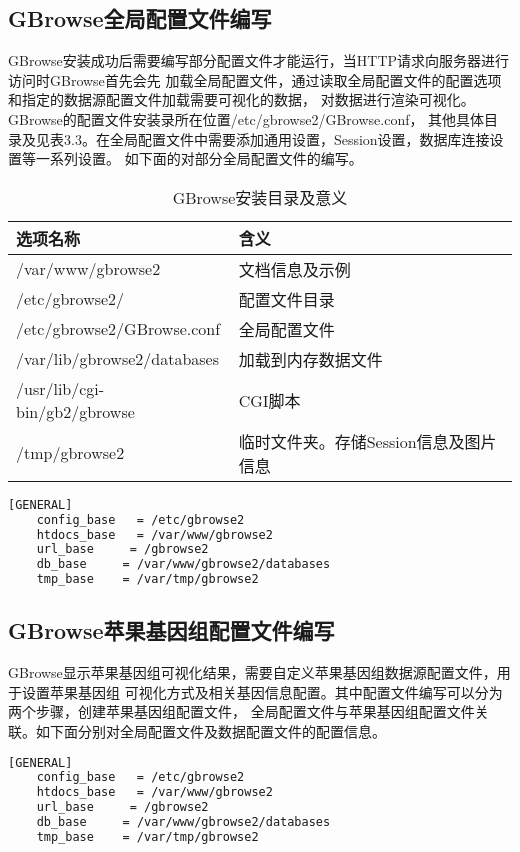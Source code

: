 	\subsection{GBrowse全局配置文件编写}
	GBrowse安装成功后需要编写部分配置文件才能运行，当HTTP请求向服务器进行访问时GBrowse首先会先
	加载全局配置文件，通过读取全局配置文件的配置选项和指定的数据源配置文件加载需要可视化的数据，
	对数据进行渲染可视化。GBrowse的配置文件安装录所在位置/etc/gbrowse2/GBrowse.conf，
	其他具体目录及见表3.3。在全局配置文件中需要添加通用设置，Session设置，数据库连接设置等一系列设置。
	如下面的对部分全局配置文件的编写。
	\begin{table}[!htbp]
		\centering
		\begin{tabular}{ll}	
			\toprule
			选项名称& 含义\\
			\midrule
			/var/www/gbrowse2&文档信息及示例\\
			/etc/gbrowse2/&配置文件目录\\
			/etc/gbrowse2/GBrowse.conf&全局配置文件\\
			/var/lib/gbrowse2/databases&加载到内存数据文件 \\
			/usr/lib/cgi-bin/gb2/gbrowse&CGI脚本\\
			/tmp/gbrowse2&临时文件夹。存储Session信息及图片信息\\
			\bottomrule
		\end{tabular}
		\caption{GBrowse安装目录及意义}
	\end{table}
	\begin{lstlisting}[language=bash]
	[GENERAL]
	config_base   = /etc/gbrowse2   
	htdocs_base   = /var/www/gbrowse2
	url_base     = /gbrowse2
	db_base     = /var/www/gbrowse2/databases
	tmp_base    = /var/tmp/gbrowse2
	\end{lstlisting}
	\subsection{GBrowse苹果基因组配置文件编写}
	GBrowse显示苹果基因组可视化结果，需要自定义苹果基因组数据源配置文件，用于设置苹果基因组
	可视化方式及相关基因信息配置。其中配置文件编写可以分为两个步骤，创建苹果基因组配置文件，
	全局配置文件与苹果基因组配置文件关联。如下面分别对全局配置文件及数据配置文件的配置信息。
	\begin{lstlisting}[language=bash]
	[GENERAL]
	config_base   = /etc/gbrowse2   
	htdocs_base   = /var/www/gbrowse2
	url_base     = /gbrowse2
	db_base     = /var/www/gbrowse2/databases
	tmp_base    = /var/tmp/gbrowse2
	\end{lstlisting}
	
